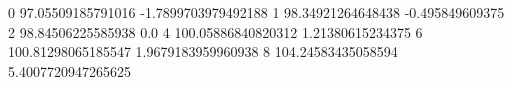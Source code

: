 0 97.05509185791016 -1.7899703979492188
1 98.34921264648438 -0.495849609375
2 98.84506225585938 0.0
4 100.05886840820312 1.21380615234375
6 100.81298065185547 1.9679183959960938
8 104.24583435058594 5.4007720947265625
